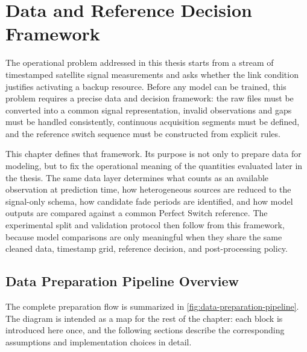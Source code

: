 \chapter{Data and Reference Decision Framework}
\label{chap:data-reference-framework}

The operational problem addressed in this thesis starts from a stream of
timestamped satellite signal measurements and asks whether the link condition
justifies activating a backup resource. Before any model can be trained, this
problem requires a precise data and decision framework: the raw files must be
converted into a common signal representation, invalid observations and gaps
must be handled consistently, continuous acquisition segments must be defined,
and the reference switch sequence must be constructed from explicit rules.

This chapter defines that framework. Its purpose is not only to prepare data
for modeling, but to fix the operational meaning of the quantities evaluated
later in the thesis. The same data layer determines what counts as an available
observation at prediction time, how heterogeneous sources are reduced to the
signal-only schema, how candidate fade periods are identified, and how model
outputs are compared against a common Perfect Switch reference. The experimental
split and validation protocol then follow from this framework, because model
comparisons are only meaningful when they share the same cleaned data,
timestamp grid, reference decision, and post-processing policy.

\section{Data Preparation Pipeline Overview}
\label{sec:data-preparation-pipeline-overview}

The complete preparation flow is summarized in
\cref{fig:data-preparation-pipeline}. The diagram is intended as a map for the
rest of the chapter: each block is introduced here once, and the following
sections describe the corresponding assumptions and implementation choices in
detail.

